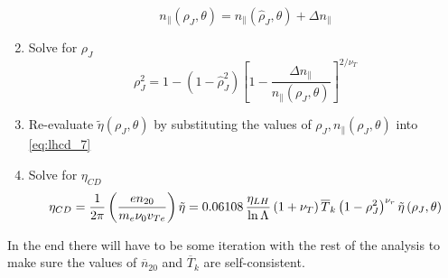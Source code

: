 \begin{enumerate}
\begin{equation}
		n _ { \| } \left( \rho _ { J } , \theta \right) = n _ { \| } \left( \hat { \rho } _ { J } , \theta \right) + \Delta n _ { \| }
	\end{equation}
	\item Solve for $\rho_J$
	\begin{equation}
		\rho _ { J } ^ { 2 } = 1 - \left( 1 - \hat { \rho } _ { J } ^ { 2 } \right) \left[ 1 - \frac { \Delta n _ { \| } } { n _ { \| } \left( \rho _ { J } , \theta \right) } \right] ^ { 2 / \nu _ { T } }
	\end{equation}
	\item Re-evaluate $\tilde { \eta } \left( \rho _ { J } , \theta \right)$ by substituting the values of $\rho _ { J } , n _ { \| } \left( \rho _ { J } , \theta \right)$ into \cref{eq:lhcd_7}
	\item Solve for $\eta_{CD}$
	\begin{equation}
		\small 
		\eta _ { C D } = \frac { 1 } { 2 \pi } \left( \frac { e n _ { 20 } } { m _ { e } \nu _ { 0 } v _ { T e } } \right) \tilde { \eta } = 0.06108 \, \frac { \eta _ { L H } } { \ln \Lambda } \left( 1 + \nu _ { T } \right) \overline { T } _ { k } \left( 1 - \rho _ { J } ^ { 2 } \right) ^ { \nu _ { r } } \tilde { \eta } \left( \rho _ { J } , \theta \right)
	\end{equation}
\end{enumerate}
In the end there will have to be some iteration with the rest of the analysis to make sure the values of $\overline n_{20}$ and $\overline T_k$ are self-consistent.

